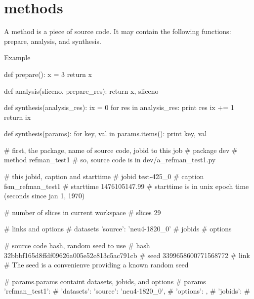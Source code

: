 \section{methods}
A method is a piece of source code.  It may contain the following
functions:  prepare, analysis, and synthesis.

Example

\begin{python}
def prepare():
  x = 3
  return x

def analysis(sliceno, prepare_res):
  return x, sliceno
  
def synthesis(analysis_res):
  ix = 0
  for res in analysis_res:
    print res
    ix += 1
  return ix
\end{python}

\begin{python}
def synthesis(params):
  for key, val in params.items():
    print key, val

# first, the package, name of source code, jobid to this job
#   package   dev
#   method    refman_test1
# so, source code is in dev/a_refman_test1.py

# this jobid, caption and starttime
#   jobid     test-425_0
#   caption   fsm_refman_test1
#   starttime 1476105147.99
# starttime is in unix epoch time (seconds since jan 1, 1970)
    
# number of slices in current workspace
#   slices    29

# links and options
#   datasets  {'source': 'neu4-1820_0'}
#   jobids    {}
#   options   {}

# source code hash, random seed to use    
#   hash      32bbbf165d8ffdf09626a005e52c813c5ac791cb
#   seed      3399658600771568772
#   link      {}
# The seed is a convenienve providing a known random seed

# params.params containt datasets, jobids, and options
#   params    {'refman_test1': {
#                'datasets': {'source': 'neu4-1820_0'},
#                'options': {},
#                'jobids': {}}
#             }
\end{python}


